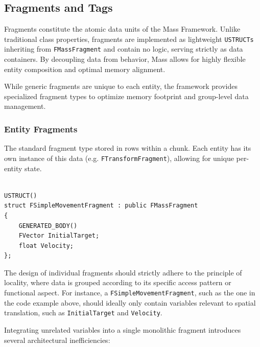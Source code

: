 \subsection{Fragments and Tags}

Fragments constitute the atomic data units of the Mass Framework. Unlike traditional class properties, fragments are implemented as lightweight \texttt{USTRUCTs} inheriting from \texttt{FMassFragment} and contain no logic, serving strictly as data containers. By decoupling data from behavior, Mass allows for highly flexible entity composition and optimal memory alignment.

While generic fragments are unique to each entity, the framework provides specialized fragment types to optimize memory footprint and group-level data management.

\subsubsection{Entity Fragments}

The standard fragment type stored in rows within a chunk. Each entity has its own instance of this data (e.g. \texttt{FTransformFragment}), allowing for unique per-entity state.

\begin{lstlisting}

USTRUCT()
struct FSimpleMovementFragment : public FMassFragment
{
	GENERATED_BODY()
	FVector InitialTarget;
	float Velocity;
};

\end{lstlisting}

The design of individual fragments should strictly adhere to the principle of locality, where data is grouped according to its specific access pattern or functional aspect. For instance, a \texttt{FSimpleMovementFragment}, such as the one in the code example above, should ideally only contain variables relevant to spatial translation, such as \texttt{InitialTarget} and \texttt{Velocity}. 

Integrating unrelated variables into a single monolithic fragment introduces several architectural inefficiencies:

